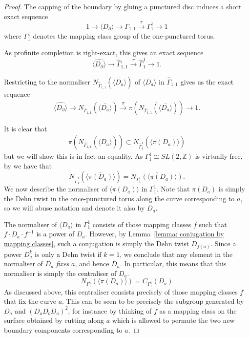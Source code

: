 \documentclass{amsart}
\newcommand{\Z}{\mathbb{Z}}
\theoremstyle{definition}
\numberwithin{equation}{section}
\begin{document}
\begin{proof}
    The capping of the boundary by gluing a punctured disc induces a short exact sequence
        \[1\to \langle D_\partial \rangle\to \Gamma_{1,1}\xrightarrow{\pi} \Gamma_1^1\to1\]
    where $\Gamma_1^1$ denotes the mapping class group of the one-punctured torus.

    As profinite completion is right-exact, this gives an exact sequence
        \[
            \widehat{\langle D_\partial \rangle}\to \widehat\Gamma_{1,1}\xrightarrow{\pi} \widehat\Gamma_1^1\to1.
        \]

    Restricting to the normaliser $N_{\widehat\Gamma_{1,1}}(\overline{\langle D_a\rangle})$ of $\overline{\langle D_a\rangle}$ in $\widehat\Gamma_{1,1}$ gives us the exact sequence
        \begin{align}\label{eq:exact-sequence-for-injectivity}
        \widehat{\langle D_\partial \rangle}\to N_{\widehat\Gamma_{1,1}}(\overline{\langle D_a\rangle})\xrightarrow{\pi} \pi(N_{\widehat\Gamma_{1,1}}(\overline{\langle D_a\rangle}))\to1.
        \end{align}

    It is clear that    
        \begin{align}\label{eq:injectivity-proof-1}
        \pi(N_{\widehat\Gamma_{1,1}}(\overline{\langle D_a\rangle}))\subset N_{\widehat\Gamma_{1}^1}(\overline{\langle \pi(D_a)\rangle})
        \end{align}
    but we will show this is in fact an equality. As $\Gamma_1^1\cong SL(2,\Z)$ is virtually free, by \cite[Corollary~2.9]{Ribes-Pavel} we have that
        \[N_{\widehat\Gamma_{1}^1}(\overline{\langle \pi(D_a)\rangle})=\overline{N_{\Gamma_{1}^1}(\langle \pi(D_a)\rangle)}.\]
    We now describe the normaliser of $\langle\pi(D_a)\rangle$ in $\Gamma_1^1$. Note that $\pi(D_a)$ is simply the Dehn twist in the once-punctured torus along the curve corresponding to $a$, so we will abuse notation and denote it also by $D_a$.
    
    The normaliser of $\langle D_a\rangle$ in $\Gamma_1^1$ consists of those mapping classes $f$ such that $f\cdot D_a\cdot f^{-1}$ is a power of $D_a$. However, by Lemma~\ref{lemma: conjugation by mapping classes}, such a conjugation is simply the Dehn twist $D_{f(a)}$. Since a power $D_a^k$ is only a Dehn twist if $k=1$, we conclude that any element in the normaliser of $D_a$ \emph{fixes} $a$, and hence $D_a$. In particular, this means that this normaliser is simply the centraliser of $D_a$.
        \[N_{\Gamma_{1}^1}(\langle \pi(D_a)\rangle)=C_{\Gamma_{1}^1}(D_a)\]
    As discussed above, this centraliser consists precisely of those mapping classes $f$ that fix the curve $a$. This can be seen to be precisely the subgroup generated by $D_a$ and $(D_a D_b D_a)^2$, for instance by thinking of $f$ as a mapping class on the surface obtained by cutting along $a$ which is allowed to permute the two new boundary components corresponding to $a$.


\end{proof}
\end{document}
